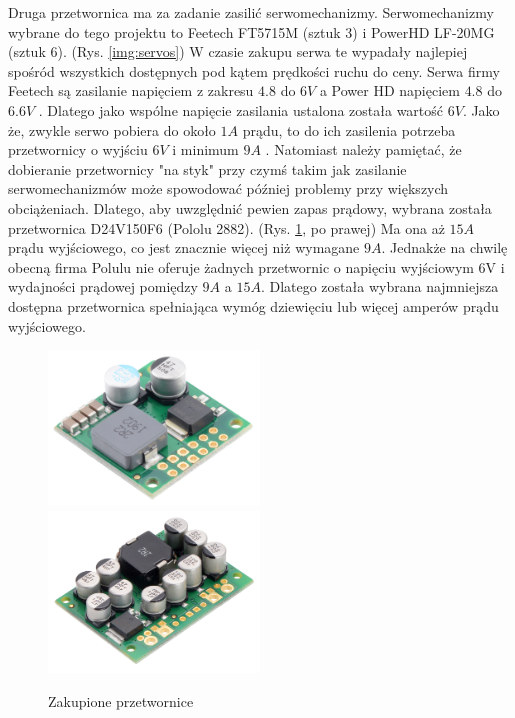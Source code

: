 Druga przetwornica ma za zadanie zasilić serwomechanizmy. Serwomechanizmy wybrane do tego projektu to Feetech FT5715M (sztuk 3) i PowerHD LF-20MG (sztuk 6). (Rys. \ref{img:servos}) W czasie zakupu serwa te wypadały najlepiej spośród wszystkich dostępnych pod kątem prędkości ruchu do ceny. Serwa firmy Feetech są zasilanie napięciem z zakresu $4.8$ do $6V$ \cite{feetech_docs} a Power HD napięciem $4.8$ do $6.6V$ \cite{powerhd_docs}. Dlatego jako wspólne napięcie zasilania ustalona została wartość $6V$. Jako że, zwykle serwo pobiera do około $1A$ prądu, to do ich zasilenia potrzeba przetwornicy o wyjściu $6V$ i minimum $9A$ \cite{Servo_power_sup}. Natomiast należy pamiętać, że dobieranie przetwornicy "na styk" przy czymś takim jak zasilanie serwomechanizmów może spowodować później problemy przy większych obciążeniach. Dlatego, aby uwzględnić pewien zapas prądowy, wybrana została przetwornica D24V150F6 (Pololu 2882). (Rys. \ref{img:voltage_converters}, po prawej) Ma ona aż $15A$ prądu wyjściowego, co jest znacznie więcej niż wymagane $9A$. Jednakże na chwilę obecną firma Polulu nie oferuje żadnych przetwornic o napięciu wyjściowym 6V i wydajności prądowej pomiędzy $9A$ a $15A$. Dlatego została wybrana najmniejsza dostępna przetwornica spełniająca wymóg dziewięciu lub więcej amperów prądu wyjściowego. \cite{polulu_step_down}


\begin{figure}[h!]
\includegraphics[width=0.5\textwidth]{img/polulu5V8A.jpg}
\includegraphics[width=0.5\textwidth]{img/polulu6V15A.jpg}
\caption{Zakupione przetwornice \cite{polulu_step_down}}
\label{img:voltage_converters}
\end{figure}

